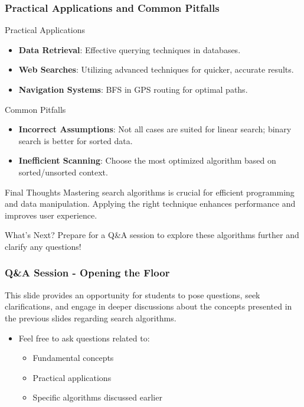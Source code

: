 \documentclass[aspectratio=169]{beamer}
\begin{document}
\begin{frame}[fragile]
    \frametitle{Practical Applications and Common Pitfalls}
    \begin{block}{Practical Applications}
        \begin{itemize}
            \item \textbf{Data Retrieval}: Effective querying techniques in databases.
            \item \textbf{Web Searches}: Utilizing advanced techniques for quicker, accurate results.
            \item \textbf{Navigation Systems}: BFS in GPS routing for optimal paths.
        \end{itemize}
    \end{block}
    
    \begin{block}{Common Pitfalls}
        \begin{itemize}
            \item \textbf{Incorrect Assumptions}: Not all cases are suited for linear search; binary search is better for sorted data.
            \item \textbf{Inefficient Scanning}: Choose the most optimized algorithm based on sorted/unsorted context.
        \end{itemize}
    \end{block}
    
    \begin{block}{Final Thoughts}
        Mastering search algorithms is crucial for efficient programming and data manipulation.
        Applying the right technique enhances performance and improves user experience.
    \end{block}
    
    \begin{block}{What's Next?}
        Prepare for a Q\&A session to explore these algorithms further and clarify any questions!
    \end{block}
\end{frame}

\begin{frame}[fragile]
  \frametitle{Q\&A Session - Opening the Floor}
  This slide provides an opportunity for students to pose questions, seek clarifications, and engage in deeper discussions about the concepts presented in the previous slides regarding search algorithms. 
  \begin{itemize}
      \item Feel free to ask questions related to:
      \begin{itemize}
          \item Fundamental concepts
          \item Practical applications
          \item Specific algorithms discussed earlier
      \end{itemize}
  \end{itemize}
\end{frame}
\end{document}
